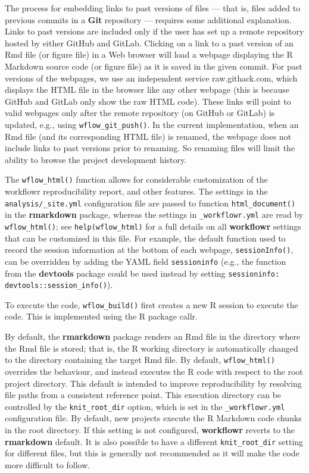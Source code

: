 \documentclass[9pt,a4paper]{extarticle}
\begin{document}
The process for embedding links to past versions of files --- that is,
files added to previous commits in a \textbf{Git} repository --- requires some
additional explanation. Links to past versions are included only if the
user has set up a remote repository hosted by either GitHub and GitLab.
Clicking on a link to a past version of an Rmd file (or figure file) in
a Web browser will load a webpage displaying the R Markdown source code
(or figure file) as it is saved in the given commit. For past versions
of the webpages, we use an independent service raw.githack.com, which
displays the HTML file in the browser like any other webpage (this is
because GitHub and GitLab only show the raw HTML code). These links will
point to valid webpages only after the remote repository (on GitHub or
GitLab) is updated, e.g., using \texttt{wflow\_git\_push()}. In the current
implementation, when an Rmd file (and its corresponding HTML file) is
renamed, the webpage does not include links to past versions prior to
renaming. So renaming files will limit the ability to browse the project
development history.

The \texttt{wflow\_html()} function allows for considerable customization of the
workflowr reproducibility report, and other features. The settings in
the \verb|analysis/_site.yml| configuration file are passed to function
\texttt{html\_document()} in the \textbf{rmarkdown} package, whereas the settings in
\verb|_workflowr.yml| are read by \texttt{wflow\_html()}; see
\texttt{help(wflow\_html)} for a full details on all \textbf{workflowr} settings
that can be customized in this file. For example, the default function
used to record the session information at the bottom of each webpage,
\texttt{sessionInfo()}, can be overridden by adding the YAML field
\verb|sessioninfo| (e.g., the function from the \textbf{devtools} package could
be used instead by setting \texttt{sessioninfo:
devtools::session\_info()}).

To execute the code, \texttt{wflow\_build()} first creates a new R session to
execute the code. This is implemented using the R package callr.

By default, the \textbf{rmarkdown} package renders an Rmd file in the directory
where the Rmd file is stored; that is, the R working directory is
automatically changed to the directory containing the target Rmd file.
By default, \texttt{wflow\_html()} overrides the behaviour, and instead executes
the R code with respect to the root project directory. This default is
intended to improve reproducibility by resolving file paths from a
consistent reference point. This execution directory can be controlled
by the \verb|knit_root_dir| option, which is set in the 
\texttt{\_workflowr.yml} configuration file. By default, new projects execute the
R Markdown code chunks in the root directory. If this setting is not
configured, \textbf{workflowr} reverts to the \textbf{rmarkdown} default. It is also
possible to have a different \texttt{knit\_root\_dir} setting for
different files, but this is generally not recommended as it will make
the code more difficult to follow.
\end{document}
